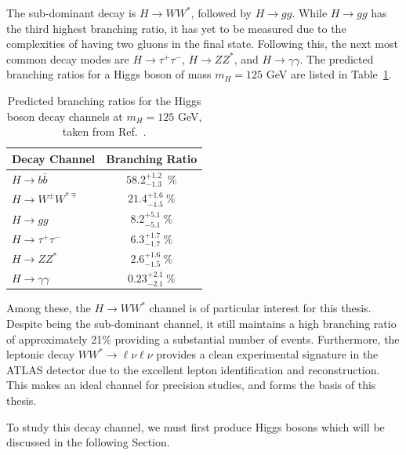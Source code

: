 The sub-dominant decay is $H \rightarrow WW^{*}$, followed by $H \rightarrow gg$. While $H \rightarrow gg$ has the third highest branching ratio, it has yet to be measured due to the complexities of having two gluons in the final state. Following this, the next most common decay modes are $H \rightarrow \tau^{+}\tau^{-}$, $H \rightarrow ZZ^{*}$, and $H \rightarrow \gamma\gamma$. The predicted branching ratios for a Higgs boson of mass $m_{H} = 125$ GeV are listed in Table~\ref{tab:BRs}.

\begin{table}[h]
  \centering
  \begin{tabular}{l|c}
    \hline
    Decay Channel & Branching Ratio \\
    \hline
    $H \rightarrow b\bar{b}$ & $58.2^{+1.2}_{-1.3}$~\% \\
    $H \rightarrow W^{\pm}W^{*\mp}$ & $21.4^{+1.6}_{-1.5}~\%$ \\
    $H \rightarrow gg$ & $8.2^{+5.1}_{-5.1}~\%$ \\
    $H \rightarrow \tau^{+}\tau^{-}$ & $6.3^{+1.7}_{-1.7}~\%$ \\
    $H \rightarrow ZZ^{*}$ & $2.6^{+1.6}_{-1.5}~\%$ \\
    $H \rightarrow \gamma\gamma$ & $0.23^{+2.1}_{-2.1}~\%$ \\
    \hline
  \end{tabular}
  \caption{Predicted branching ratios for the Higgs boson decay channels at $m_{H} = 125$ GeV, taken from Ref.~\cite{LHC_Higgs_handbook}.}\label{tab:BRs}
\end{table}

Among these, the $H \rightarrow WW^{*}$ channel is of particular interest for this thesis. Despite being the sub-dominant channel, it still maintains a high branching ratio of approximately 21\% providing a substantial number of events. Furthermore, the leptonic decay $WW^{*} \rightarrow \ell\nu\ell\nu$ provides a clean experimental signature in the ATLAS detector due to the excellent lepton identification and reconstruction. This makes an ideal channel for precision studies, and forms the basis of this thesis.

To study this decay channel, we must first produce Higgs bosons which will be discussed in the following Section.

